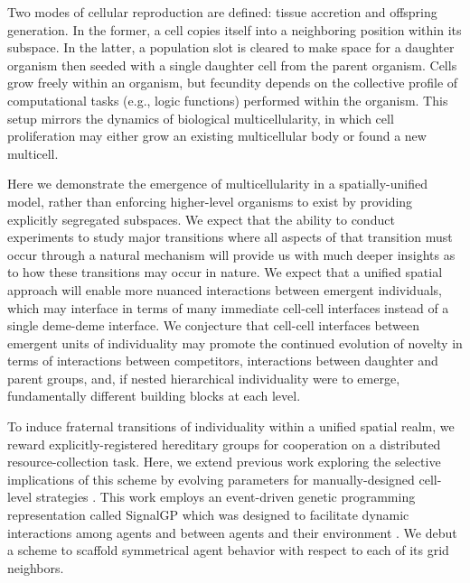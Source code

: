 Two modes of cellular reproduction are defined: tissue accretion and offspring generation.
In the former, a cell copies itself into a neighboring position within its subspace.
In the latter, a population slot is cleared to make space for a daughter organism then seeded with a single daughter cell from the parent organism.
Cells grow freely within an organism, but fecundity depends on the collective profile of computational tasks (e.g., logic functions) performed within the organism.
This setup mirrors the dynamics of biological multicellularity, in which cell proliferation may either grow an existing multicellular body or found a new multicell.


Here we demonstrate the emergence of multicellularity in a spatially-unified model, rather than enforcing higher-level organisms to exist by providing explicitly segregated subspaces.
We expect that the ability to conduct experiments to study major transitions where all aspects of that transition must occur through a natural mechanism will provide us with much deeper insights as to how these transitions may occur in nature.
We expect that a unified spatial approach will enable more nuanced interactions between emergent individuals, which may interface in terms of many immediate cell-cell interfaces instead of a single deme-deme interface.
We conjecture that cell-cell interfaces between emergent units of individuality may promote the continued evolution of novelty in terms of interactions between competitors, interactions between daughter and parent groups, and, if nested hierarchical individuality were to emerge, fundamentally different building blocks at each level.

To induce fraternal transitions of individuality within a unified spatial realm, we reward explicitly-registered hereditary groups for cooperation on a distributed resource-collection task.
Here, we extend previous work exploring the selective implications of this scheme by evolving parameters for manually-designed cell-level strategies \citep{moreno2019toward}.
This work employs an event-driven genetic programming representation called SignalGP which was designed to facilitate dynamic interactions among agents and between agents and their environment \citep{lalejini2018evolving}.
We debut a scheme to scaffold symmetrical agent behavior with respect to each of its grid neighbors.
